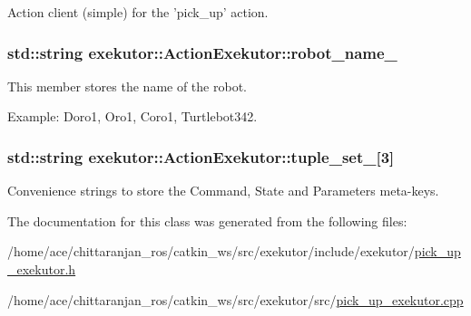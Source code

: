 \-Action client (simple) for the 'pick\-\_\-up' action. 

\hypertarget{classexekutor_1_1ActionExekutor_af165894bbbbabd62c17be857be095936}{
\subsubsection[{robot\-\_\-name\-\_\-}]{\setlength{\rightskip}{0pt plus 5cm}std\-::string {\bf exekutor\-::\-Action\-Exekutor\-::robot\-\_\-name\-\_\-}}}\label{classexekutor_1_1ActionExekutor_af165894bbbbabd62c17be857be095936}


\-This member stores the name of the robot. 

\-Example\-: \-Doro1, \-Oro1, \-Coro1, \-Turtlebot342. \hypertarget{classexekutor_1_1ActionExekutor_a4407dd299ca8494945da306b6a367108}{
\subsubsection[{tuple\-\_\-set\-\_\-}]{\setlength{\rightskip}{0pt plus 5cm}std\-::string {\bf exekutor\-::\-Action\-Exekutor\-::tuple\-\_\-set\-\_\-}\mbox{[}3\mbox{]}}}\label{classexekutor_1_1ActionExekutor_a4407dd299ca8494945da306b6a367108}


\-Convenience strings to store the \-Command, \-State and \-Parameters meta-\/keys. 



\-The documentation for this class was generated from the following files\-:\begin{DoxyCompactItemize}
\item 
/home/ace/chittaranjan\-\_\-ros/catkin\-\_\-ws/src/exekutor/include/exekutor/\hyperlink{pick__up__exekutor_8h}{pick\-\_\-up\-\_\-exekutor.\-h}\item 
/home/ace/chittaranjan\-\_\-ros/catkin\-\_\-ws/src/exekutor/src/\hyperlink{pick__up__exekutor_8cpp}{pick\-\_\-up\-\_\-exekutor.\-cpp}\end{DoxyCompactItemize}
